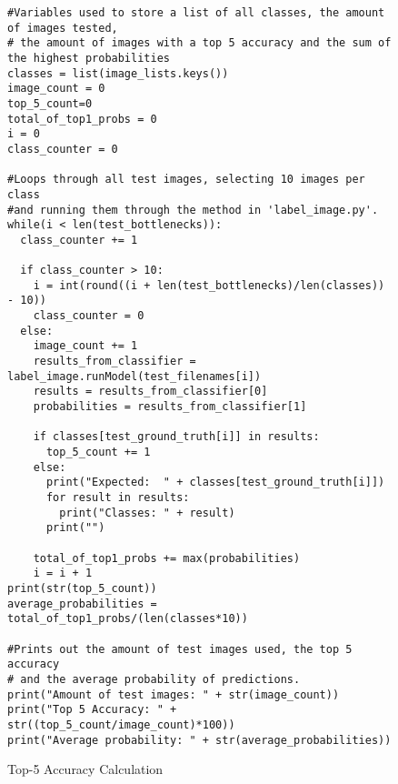 \begin{figure}[h]
\caption{Top-5 Accuracy Calculation}
\label{lst:top5}
\begin{lstlisting}[style=Python]
#Variables used to store a list of all classes, the amount of images tested,
# the amount of images with a top 5 accuracy and the sum of the highest probabilities
classes = list(image_lists.keys())
image_count = 0
top_5_count=0
total_of_top1_probs = 0
i = 0 
class_counter = 0

#Loops through all test images, selecting 10 images per class 
#and running them through the method in 'label_image.py'.
while(i < len(test_bottlenecks)):
  class_counter += 1
  
  if class_counter > 10:
    i = int(round((i + len(test_bottlenecks)/len(classes)) - 10))
    class_counter = 0
  else:
    image_count += 1
    results_from_classifier = label_image.runModel(test_filenames[i])
    results = results_from_classifier[0]
    probabilities = results_from_classifier[1]

    if classes[test_ground_truth[i]] in results:
      top_5_count += 1
    else:
      print("Expected:  " + classes[test_ground_truth[i]])
      for result in results:
        print("Classes: " + result)
      print("")

    total_of_top1_probs += max(probabilities)
    i = i + 1
print(str(top_5_count))
average_probabilities = total_of_top1_probs/(len(classes*10))

#Prints out the amount of test images used, the top 5 accuracy
# and the average probability of predictions.
print("Amount of test images: " + str(image_count))
print("Top 5 Accuracy: " + str((top_5_count/image_count)*100))
print("Average probability: " + str(average_probabilities))
\end{lstlisting}
\end{figure}

